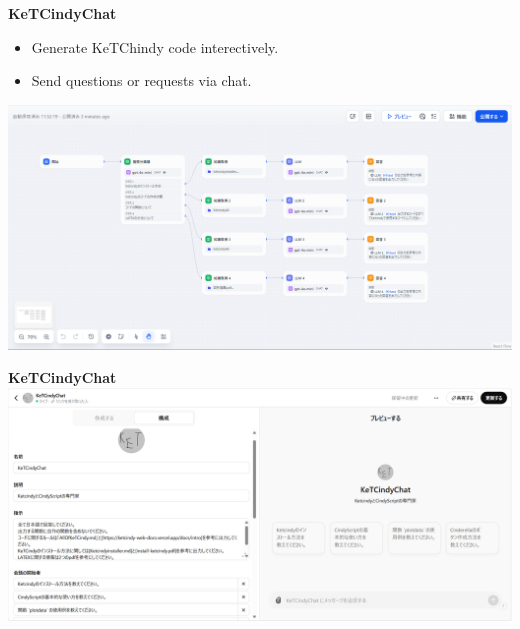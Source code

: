 \documentclass[dvipdfmx, unicode]{beamer}
\begin{document}
\begin{frame}[t]{\bfseries KeTCindyChat}
  \begin{itemize}
    \item Generate KeTChindy code interectively.
    \item Send questions or requests via chat.
  \end{itemize}
  \includegraphics[width=\linewidth]{img/KeTCindyChat/appabout.png}
\end{frame}


\begin{frame}{\bfseries KeTCindyChat}
  \includegraphics[width=\linewidth]{img/KeTCindyChat/appaboutGPT.png}
\end{frame}
\end{document}
